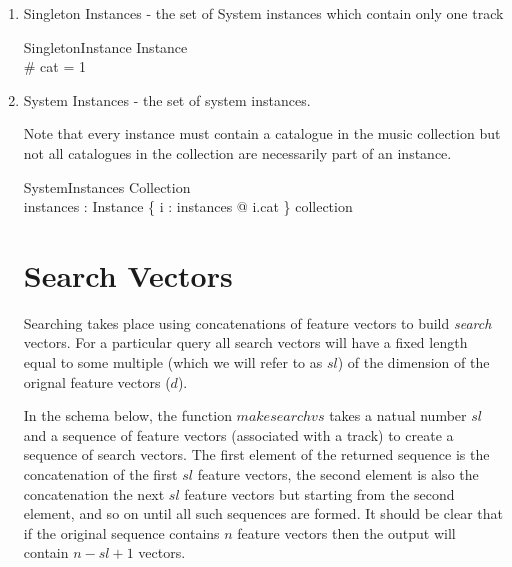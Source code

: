 \documentclass[11pt]{article}
\begin{document}
\begin{enumerate}
\item  \textsf{Singleton Instances}  - the set of System instances which contain only one track

\begin{schema}{SingletonInstance} 
	Instance \\
\where
	\# cat = 1 
\end{schema}

\item  \textsf{System Instances}  - the set of system instances.

Note that every instance must contain a catalogue in the music collection but not all catalogues in the collection are necessarily part of an instance. 

\begin{schema}{SystemInstances}
		Collection \\
		instances : \power Instance
\where
		\{ i : instances @ i.cat \} \subseteq collection
\end{schema}
		
\section{Search Vectors}
Searching takes place using concatenations of feature vectors to build \emph{search} vectors. For a particular query all search vectors will have a fixed length equal to some multiple (which we will refer to as $sl$) of the dimension of the orignal feature vectors ($d$). 

In the schema below, the function $makesearchvs$ takes a natual number $sl$ and a sequence of feature vectors (associated with a track) to create a sequence of search vectors. The first element of the returned sequence is the concatenation of the first $sl$ feature vectors, the second element is also the concatenation the next $sl$ feature vectors but starting from the second element, and so on until all such sequences are formed.  It should be clear that if the original sequence contains $n$ feature vectors then the output will contain $n-sl+1$ vectors. 


\end{enumerate}
\end{document}
